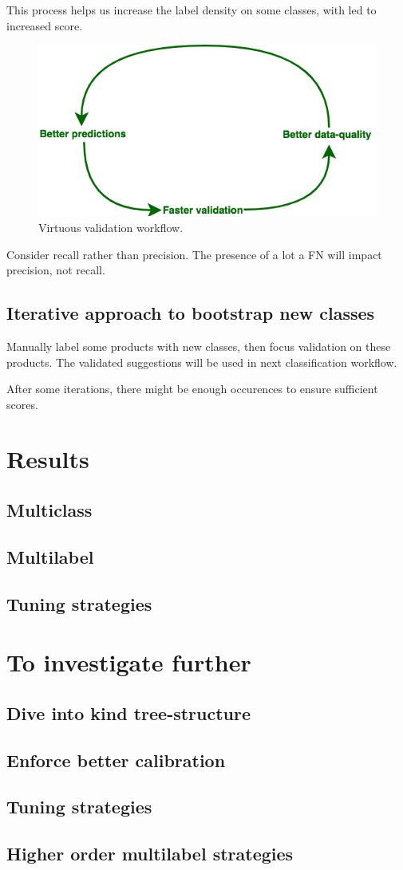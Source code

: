 This process helps us increase the label density on some classes, with led to increased score.

\begin{figure}[H]
\centering
\includegraphics[scale=0.6]{./images/incompletely-labeled/virtuous-circle.png}
\caption{Virtuous validation workflow.}
\end{figure}


Consider recall rather than precision. The presence of a lot a FN will impact precision, not recall.

\subsection{Iterative approach to bootstrap new classes}
Manually label some products with new classes, then focus validation on these products. The validated suggestions will be used in next classification workflow.

After some iterations, there might be enough occurences to ensure sufficient scores.

\section{Results}
\subsection{Multiclass}
\subsection{Multilabel}
\subsection{Tuning strategies}

\section{To investigate further}

\subsection{Dive into kind tree-structure}
\subsection{Enforce better calibration}
\subsection{Tuning strategies}
\subsection{Higher order multilabel strategies}
